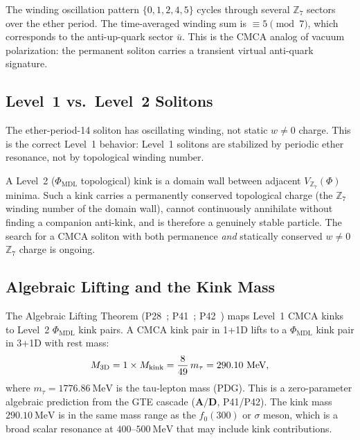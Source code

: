 \documentclass[11pt]{article}
\theoremstyle{remark}
\newcommand{\PHIMDL}{\Phi_{\mathrm{MDL}}}
\newcommand{\ZS}{\mathbb{Z}_7}
\newcommand{\Mkink}{M_{\rm kink}}
\newcommand{\mtau}{m_\tau}
\newcommand{\CatAD}{\textbf{A/D}}
\newcommand{\CMCA}{\text{CMCA}}
\begin{document}
The winding oscillation pattern $\{0, 1, 2, 4, 5\}$ cycles through
several $\ZS$ sectors over the ether period. The time-averaged winding
sum is $\equiv 5 \pmod{7}$, which corresponds to the anti-up-quark
sector $\bar{u}$. This is the $\CMCA$ analog of vacuum polarization: the
permanent soliton carries a transient virtual anti-quark signature.

\subsection{Level~1 vs.\ Level~2 Solitons}

The ether-period-14 soliton has oscillating winding, not static $w \neq 0$
charge. This is the correct Level~1 behavior: Level~1 solitons are
stabilized by periodic ether resonance, not by topological winding number.

A Level~2 ($\PHIMDL$ topological) kink is a domain wall between adjacent
$V_{\ZS}(\Phi)$ minima. Such a kink carries a permanently conserved
topological charge (the $\ZS$ winding number of the domain wall), cannot
continuously annihilate without finding a companion anti-kink, and is
therefore a genuinely stable particle. The search for a $\CMCA$ soliton
with both permanence \emph{and} statically conserved $w \neq 0$ $\ZS$
charge is ongoing.

\subsection{Algebraic Lifting and the Kink Mass}

The Algebraic Lifting Theorem (P28~\cite{SpivackCompUniversality}; P41~\cite{SpivackCMCA}; P42~\cite{SpivackPhiMDLField}) maps Level~1 $\CMCA$ kinks to Level~2
$\PHIMDL$ kink pairs. A $\CMCA$ kink pair in 1+1D lifts to a $\PHIMDL$
kink pair in 3+1D with rest mass:
\begin{equation}
  M_{\rm 3D} = 1 \times \Mkink = \frac{8}{49}\,\mtau = 290.10\ \text{MeV},
  \label{eq:kink-mass}
\end{equation}
where $\mtau = 1776.86\ \text{MeV}$ is the tau-lepton mass (PDG).
This is a zero-parameter algebraic prediction from the GTE cascade
($\CatAD$, P41/P42). The kink mass $290.10\ \text{MeV}$ is in the same
mass range as the $f_0(300)$ or $\sigma$ meson, which is a broad
scalar resonance at $400$--$500\ \text{MeV}$ that may include kink
contributions.

\FloatBarrier

\end{document}
